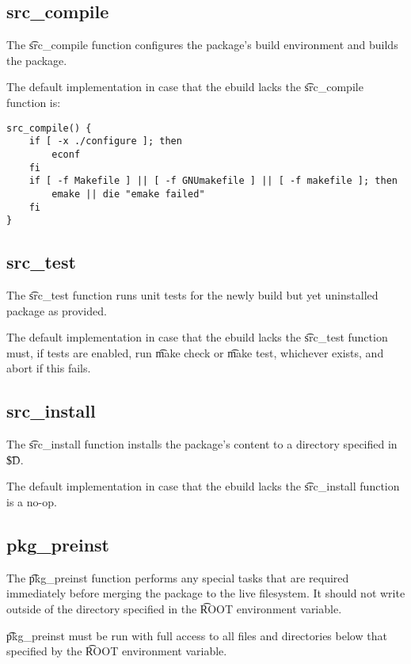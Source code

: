 \subsection{src\_compile}
\label{src-compile-function}

The \t{src\_compile} function configures the package's build environment and builds the package.

The default implementation in case that the ebuild lacks the \t{src\_compile} function is:

\begin{lstlisting}
src_compile() {
    if [ -x ./configure ]; then
        econf
    fi
    if [ -f Makefile ] || [ -f GNUmakefile ] || [ -f makefile ]; then
        emake || die "emake failed"
    fi
}
\end{lstlisting}

\subsection{src\_test}
\label{src-test-function}

The \t{src\_test} function runs unit tests for the newly build but yet uninstalled package as
provided.

The default implementation in case that the ebuild lacks the \t{src\_test} function must, if tests
are enabled, run \t{make check} or \t{make test}, whichever exists, and abort if this fails.

\subsection{src\_install}
\label{src-install-function}

The \t{src\_install} function installs the package's content to a directory specified in
\t{\${D}}.

The default implementation in case that the ebuild lacks the \t{src\_install} function is a no-op.

\subsection{pkg\_preinst}
\label{pkg-preinst-function}

The \t{pkg\_preinst} function performs any special tasks that are required immediately before
merging the package to the live filesystem. It should not write outside of the directory specified
in the \t{ROOT} environment variable.

\t{pkg\_preinst} must be run with full access to all files and directories below that specified by
the \t{ROOT} environment variable.

